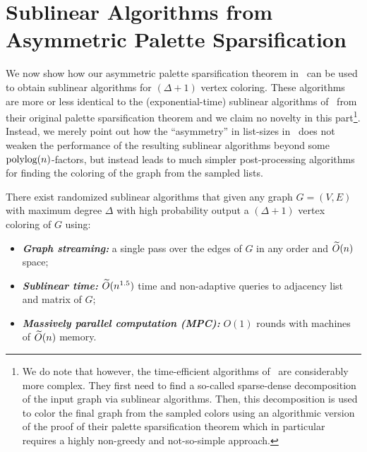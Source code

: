 
\newcommand{\LL}{\ensuremath{\mathcal{L}}}



\section{Sublinear Algorithms from Asymmetric Palette Sparsification}\label{sec:asymmetric} 

We now show how our asymmetric palette sparsification theorem in~ can be used to obtain sublinear algorithms for $(\Delta+1)$ vertex coloring. These algorithms are more or less identical 
to the (exponential-time) sublinear algorithms of~\cite{AssadiCK19} from their original palette sparsification theorem and we claim no novelty in this part\footnote{We do note that however, the time-efficient algorithms of~\cite{AssadiCK19} are considerably more complex. They first need to find a so-called sparse-dense decomposition of the input graph via sublinear algorithms. Then, this decomposition is used to color the final graph from the sampled colors using an algorithmic version of the proof of their palette sparsification theorem which in particular requires a highly non-greedy and not-so-simple approach.}. Instead, we merely point out how the ``asymmetry'' in list-sizes in~ 
does not weaken the performance of the resulting sublinear algorithms beyond some $\mbox{\rm polylog}{(n)}$-factors, but instead leads to much simpler post-processing algorithms for finding the coloring of the graph from the sampled lists. 

\begin{theorem}\label{thm:sublinear}
	There exist randomized sublinear algorithms that given any graph $G=(V,E)$ with maximum degree $\Delta$ with high probability output a $(\Delta+1)$ vertex coloring of $G$ using: 
	\begin{itemize}
		\item \emph{\textbf{Graph streaming:}} a single pass over the edges of $G$ in any order and $\widetilde{O}(n)$ space; 
		\item \emph{\textbf{Sublinear time:}} $\widetilde{O}(n^{1.5})$ time and non-adaptive queries to adjacency list and matrix of $G$;
		\item \emph{\textbf{Massively parallel computation (MPC):}} $O(1)$ rounds with machines of $\widetilde{O}(n)$ memory.  
	\end{itemize}
\end{theorem}

